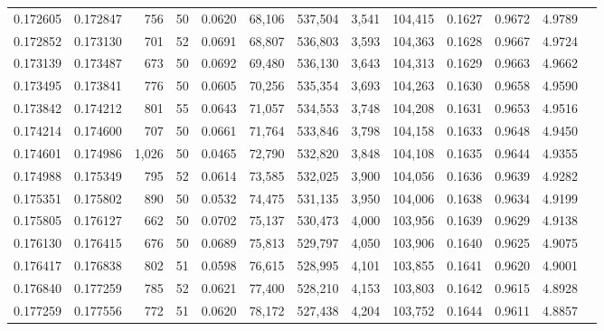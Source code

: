 \begin{tabular}{rrrrrrrrrrrrr}
0.172605 & 0.172847 &   756 &  50 &                                     0.0620 &  68,106 & 537,504 &   3,541 & 104,415 & 0.1627 & 0.9672 & 4.9789 \\
0.172852 & 0.173130 &   701 &  52 &                                     0.0691 &  68,807 & 536,803 &   3,593 & 104,363 & 0.1628 & 0.9667 & 4.9724 \\
0.173139 & 0.173487 &   673 &  50 &                                     0.0692 &  69,480 & 536,130 &   3,643 & 104,313 & 0.1629 & 0.9663 & 4.9662 \\
0.173495 & 0.173841 &   776 &  50 &                                     0.0605 &  70,256 & 535,354 &   3,693 & 104,263 & 0.1630 & 0.9658 & 4.9590 \\
0.173842 & 0.174212 &   801 &  55 &                                     0.0643 &  71,057 & 534,553 &   3,748 & 104,208 & 0.1631 & 0.9653 & 4.9516 \\
0.174214 & 0.174600 &   707 &  50 &                                     0.0661 &  71,764 & 533,846 &   3,798 & 104,158 & 0.1633 & 0.9648 & 4.9450 \\
0.174601 & 0.174986 & 1,026 &  50 &                                     0.0465 &  72,790 & 532,820 &   3,848 & 104,108 & 0.1635 & 0.9644 & 4.9355 \\
0.174988 & 0.175349 &   795 &  52 &                                     0.0614 &  73,585 & 532,025 &   3,900 & 104,056 & 0.1636 & 0.9639 & 4.9282 \\
0.175351 & 0.175802 &   890 &  50 &                                     0.0532 &  74,475 & 531,135 &   3,950 & 104,006 & 0.1638 & 0.9634 & 4.9199 \\
0.175805 & 0.176127 &   662 &  50 &                                     0.0702 &  75,137 & 530,473 &   4,000 & 103,956 & 0.1639 & 0.9629 & 4.9138 \\
0.176130 & 0.176415 &   676 &  50 &                                     0.0689 &  75,813 & 529,797 &   4,050 & 103,906 & 0.1640 & 0.9625 & 4.9075 \\
0.176417 & 0.176838 &   802 &  51 &                                     0.0598 &  76,615 & 528,995 &   4,101 & 103,855 & 0.1641 & 0.9620 & 4.9001 \\
0.176840 & 0.177259 &   785 &  52 &                                     0.0621 &  77,400 & 528,210 &   4,153 & 103,803 & 0.1642 & 0.9615 & 4.8928 \\
0.177259 & 0.177556 &   772 &  51 &                                     0.0620 &  78,172 & 527,438 &   4,204 & 103,752 & 0.1644 & 0.9611 & 4.8857 \\

\end{tabular}

